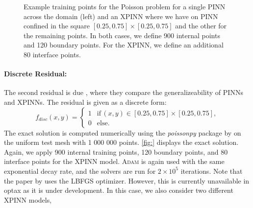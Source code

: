 \begin{figure}[t]
    \hfill
    \caption{Example training points for the Poisson problem for a single PINN across the domain (left) and an XPINN where we have on PINN confined in the square $[0.25, 0.75]\times [0.25, 0.75]$ and the other for the remaining points. In both cases, we define 900 internal points and 120 boundary points. For the XPINN, we define an additional 80 interface points.}
    \label{fig:decomp_poisson}
\end{figure}

\paragraph{Discrete Residual:}
The second residual is due \cite{XPINN_generalize}, where they compare the generalizeability of PINNs and XPINNs. The residual is given as a discrete form:
\begin{equation*}
    f_{disc}(x,y)=
    \begin{cases}
        1 &\text{if} \, (x,y)\in [0.25,0.75]\times[0.25,0.75], \\
        0 &\text{else}.
        \label{eq:discrete_poisson}
    \end{cases}
\end{equation*}
The exact solution is computed numerically using the \textit{poissonpy} package by \cite{poissonpy} on the uniform test mesh with 1 000 000 points. \ref{fig:} displays the exact solution. Again, we apply 900 internal training points, 120 boundary points, and 80 interface points for the XPINN model. \textsc{Adam} is again used with the same exponential decay rate, and the solvers are run for $2\times 10^5$ iterations. Note that the paper by \textcite{XPINN_generalize} uses the LBFGS optimizer. However, this is currently unavailable in optax as it is under development. In this case, we also consider two different XPINN models, 

